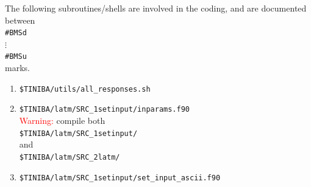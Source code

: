 The following subroutines/shells are involved in the coding,
and are documented between\\
\verb=#BMSd=\\
$\vdots$\\
\verb=#BMSu=\\
marks.
\begin{enumerate}
\item \verb=$TINIBA/utils/all_responses.sh=
\item \verb=$TINIBA/latm/SRC_1setinput/inparams.f90=\\
\textcolor{red}{Warning:} compile both\\
\verb=$TINIBA/latm/SRC_1setinput/= \\
and\\
\verb=$TINIBA/latm/SRC_2latm/= 
\item \verb=$TINIBA/latm/SRC_1setinput/set_input_ascii.f90=\\
\end{enumerate}
